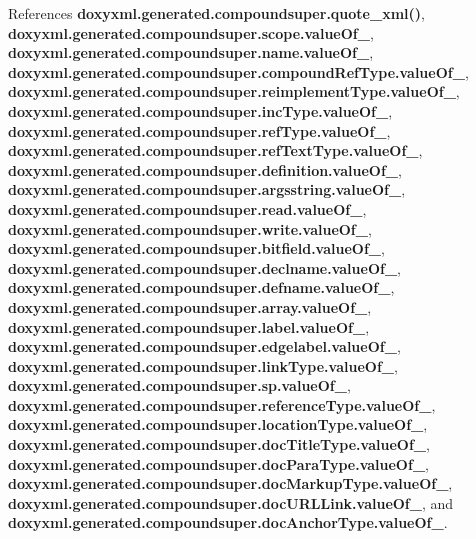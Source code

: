 References {\bf doxyxml.\+generated.\+compoundsuper.\+quote\+\_\+xml()}, {\bf doxyxml.\+generated.\+compoundsuper.\+scope.\+value\+Of\+\_\+}, {\bf doxyxml.\+generated.\+compoundsuper.\+name.\+value\+Of\+\_\+}, {\bf doxyxml.\+generated.\+compoundsuper.\+compound\+Ref\+Type.\+value\+Of\+\_\+}, {\bf doxyxml.\+generated.\+compoundsuper.\+reimplement\+Type.\+value\+Of\+\_\+}, {\bf doxyxml.\+generated.\+compoundsuper.\+inc\+Type.\+value\+Of\+\_\+}, {\bf doxyxml.\+generated.\+compoundsuper.\+ref\+Type.\+value\+Of\+\_\+}, {\bf doxyxml.\+generated.\+compoundsuper.\+ref\+Text\+Type.\+value\+Of\+\_\+}, {\bf doxyxml.\+generated.\+compoundsuper.\+definition.\+value\+Of\+\_\+}, {\bf doxyxml.\+generated.\+compoundsuper.\+argsstring.\+value\+Of\+\_\+}, {\bf doxyxml.\+generated.\+compoundsuper.\+read.\+value\+Of\+\_\+}, {\bf doxyxml.\+generated.\+compoundsuper.\+write.\+value\+Of\+\_\+}, {\bf doxyxml.\+generated.\+compoundsuper.\+bitfield.\+value\+Of\+\_\+}, {\bf doxyxml.\+generated.\+compoundsuper.\+declname.\+value\+Of\+\_\+}, {\bf doxyxml.\+generated.\+compoundsuper.\+defname.\+value\+Of\+\_\+}, {\bf doxyxml.\+generated.\+compoundsuper.\+array.\+value\+Of\+\_\+}, {\bf doxyxml.\+generated.\+compoundsuper.\+label.\+value\+Of\+\_\+}, {\bf doxyxml.\+generated.\+compoundsuper.\+edgelabel.\+value\+Of\+\_\+}, {\bf doxyxml.\+generated.\+compoundsuper.\+link\+Type.\+value\+Of\+\_\+}, {\bf doxyxml.\+generated.\+compoundsuper.\+sp.\+value\+Of\+\_\+}, {\bf doxyxml.\+generated.\+compoundsuper.\+reference\+Type.\+value\+Of\+\_\+}, {\bf doxyxml.\+generated.\+compoundsuper.\+location\+Type.\+value\+Of\+\_\+}, {\bf doxyxml.\+generated.\+compoundsuper.\+doc\+Title\+Type.\+value\+Of\+\_\+}, {\bf doxyxml.\+generated.\+compoundsuper.\+doc\+Para\+Type.\+value\+Of\+\_\+}, {\bf doxyxml.\+generated.\+compoundsuper.\+doc\+Markup\+Type.\+value\+Of\+\_\+}, {\bf doxyxml.\+generated.\+compoundsuper.\+doc\+U\+R\+L\+Link.\+value\+Of\+\_\+}, and {\bf doxyxml.\+generated.\+compoundsuper.\+doc\+Anchor\+Type.\+value\+Of\+\_\+}.




